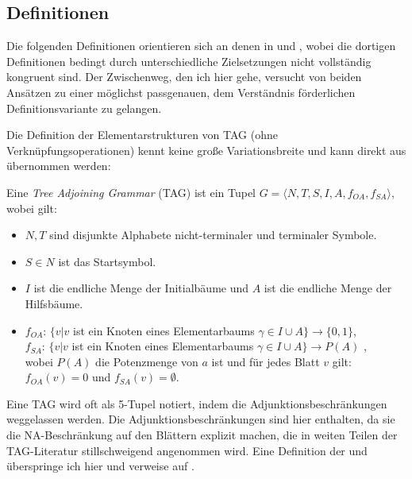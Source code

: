 \subsection{Definitionen}\label{sec-ttmctag-definitionen}

Die folgenden Definitionen orientieren sich an denen in \cite{Kallmeyer:05} und \cite{Kallmeyer:09}, wobei die dortigen Definitionen bedingt durch unterschiedliche Zielsetzungen nicht vollständig kongruent sind. Der Zwischenweg, den ich hier gehe, versucht von beiden Ansätzen zu einer möglichst passgenauen, dem Verständnis förderlichen Definitionsvariante zu gelangen. 

\newpage
Die Definition der Elementarstrukturen von TAG (ohne Verknüpfungsoperationen) kennt keine gro\ss e Variationsbreite und kann direkt aus \cite{Kallmeyer:09} übernommen werden:   
\begin{definition}
Eine {\it Tree Adjoining Grammar} (TAG) ist ein Tupel $G = \langle N,T,S,I,A,f_{\mathit{OA}},f_{\mathit{SA}} \rangle$, wobei gilt:
\begin{itemize}
  \item $N,T$ sind disjunkte Alphabete nicht-terminaler und terminaler Symbole.
  \item $S \in N$ ist das Startsymbol.
  \item $I$ ist die endliche Menge der Initialbäume und $A$ ist die endliche Menge der Hilfsbäume.
  \item $f_{\mathit{OA}}$: $\{ v | v$ ist ein Knoten eines Elementarbaums $\gamma \in I \cup A \} \to \{0,1\}$, \\
        $f_{\mathit{SA}}$: $\{ v | v$ ist ein Knoten eines Elementarbaums $\gamma \in I \cup A \} \to P(A)$ ,\\
        wobei $P(A)$ die Potenzmenge von $a$ ist und für jedes Blatt $v$ gilt: $f_{\mathit{OA}}(v) = 0$ und $f_{\mathit{SA}}(v) = \emptyset$. 
\end{itemize}
\end{definition}
Eine TAG wird oft als 5-Tupel notiert, indem die Adjunktionsbeschränkungen weggelassen werden. Die Adjunktionsbeschränkungen sind hier enthalten, da sie die NA-Beschränkung auf den Blättern explizit machen, die in weiten Teilen der TAG-Literatur stillschweigend angenommen wird. Eine Definition der  und  überspringe ich hier und verweise auf \citet[59f]{Kallmeyer:09}.

